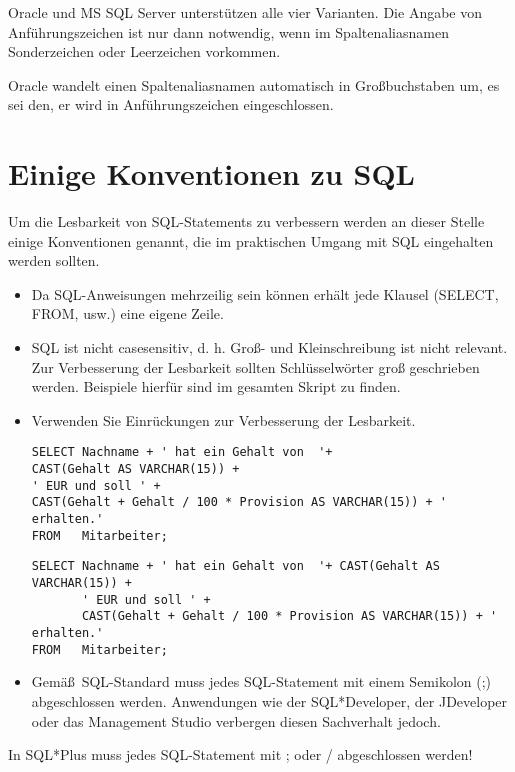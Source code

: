         Oracle und MS SQL Server unterst\"utzen alle vier Varianten. Die Angabe von Anf\"uhrungszeichen ist nur dann notwendig, wenn im Spaltenaliasnamen Sonderzeichen oder Leerzeichen vorkommen.
        \begin{merke}
          Oracle wandelt einen Spaltenaliasnamen automatisch in Gro\ss{}buchstaben um, es sei den, er wird in Anf\"uhrungszeichen eingeschlossen.
        \end{merke}
    \section{Einige Konventionen zu SQL}
      Um die Lesbarkeit von SQL-Statements zu verbessern werden an dieser Stelle einige Konventionen genannt, die im praktischen Umgang mit SQL eingehalten werden sollten.
      \begin{itemize}
        \item Da SQL-Anweisungen mehrzeilig sein k\"onnen erh\"alt jede Klausel (SELECT, FROM, usw.) eine eigene Zeile.
        \item SQL ist nicht casesensitiv, d. h. Gro\ss{}- und Kleinschreibung ist nicht relevant. Zur Verbesserung der Lesbarkeit sollten Schl\"usselw\"orter gro\ss{} geschrieben werden. Beispiele hierf\"ur sind im gesamten Skript zu finden.
        \item Verwenden Sie Einr\"uckungen zur Verbesserung der Lesbarkeit.
          \begin{lstlisting}[language=ms_sql,caption={So nicht!},label=sql01_10]
SELECT Nachname + ' hat ein Gehalt von  '+
CAST(Gehalt AS VARCHAR(15)) +
' EUR und soll ' +
CAST(Gehalt + Gehalt / 100 * Provision AS VARCHAR(15)) + ' erhalten.'
FROM   Mitarbeiter;
          \end{lstlisting}
          \begin{lstlisting}[language=ms_sql,caption={Viel besser lesbar!},label=sql_01_11]
SELECT Nachname + ' hat ein Gehalt von  '+ CAST(Gehalt AS VARCHAR(15)) +
       ' EUR und soll ' +
       CAST(Gehalt + Gehalt / 100 * Provision AS VARCHAR(15)) + ' erhalten.'
FROM   Mitarbeiter;
          \end{lstlisting}
        \item Gem\"a\ss\ SQL-Standard muss jedes SQL-Statement mit einem Semikolon (;) abgeschlossen werden. Anwendungen wie der SQL*Developer, der JDeveloper oder das Management Studio verbergen diesen Sachverhalt jedoch.
      \end{itemize}
      \begin{merke}
        In SQL*Plus muss jedes SQL-Statement mit ; oder / abgeschlossen werden!
      \end{merke}
